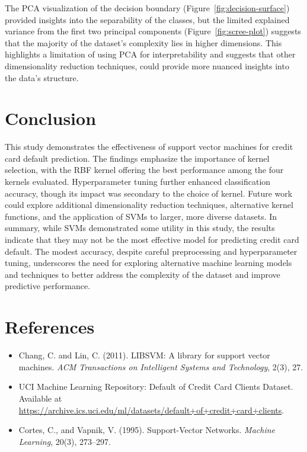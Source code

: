 \documentclass{article}
\begin{document}
The PCA visualization of the decision boundary (Figure~\ref{fig:decision-surface}) provided insights into the separability of the classes, but the limited explained variance from the first two principal components (Figure~\ref{fig:scree-plot}) 
suggests that the majority of the dataset's complexity lies in higher dimensions. This highlights a limitation of using PCA for interpretability and suggests that other dimensionality reduction techniques, could provide more nuanced insights into the data's structure.

\section{Conclusion}
This study demonstrates the effectiveness of support vector machines for credit card default prediction. The findings emphasize the importance of kernel selection, with the RBF kernel offering the best performance among the four kernels evaluated. 
Hyperparameter tuning further enhanced classification accuracy, though its impact was secondary to the choice of kernel. Future work could explore additional dimensionality reduction techniques, alternative kernel functions, and the application of SVMs to larger, more diverse datasets.
In summary, while SVMs demonstrated some utility in this study, the results indicate that they may not be the most effective model for predicting credit card default. The modest accuracy, despite careful preprocessing and hyperparameter tuning, 
underscores the need for exploring alternative machine learning models and techniques to better address the complexity of the dataset and improve predictive performance.

\section*{References}
\begin{itemize}
    \item Chang, C. and Lin, C. (2011). LIBSVM: A library for support vector machines. \textit{ACM Transactions on Intelligent Systems and Technology}, 2(3), 27.
    \item UCI Machine Learning Repository: Default of Credit Card Clients Dataset. Available at \url{https://archive.ics.uci.edu/ml/datasets/default+of+credit+card+clients}.
    \item Cortes, C., and Vapnik, V. (1995). Support-Vector Networks. \textit{Machine Learning}, 20(3), 273–297.
\end{itemize}
\end{document}
